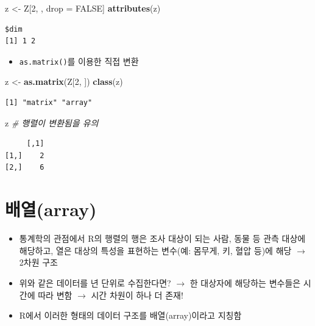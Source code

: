 \documentclass[
  11pt,
]{krantz}
\newenvironment{Shaded}{\begin{snugshade}}{\end{snugshade}}
\newcommand{\CommentTok}[1]{\textcolor[rgb]{0.37,0.37,0.37}{\textit{#1}}}
\newcommand{\DecValTok}[1]{\textcolor[rgb]{0.06,0.06,0.06}{#1}}
\newcommand{\KeywordTok}[1]{\textcolor[rgb]{0.27,0.27,0.27}{\textbf{#1}}}
\newcommand{\NormalTok}[1]{#1}
\newcommand{\OtherTok}[1]{\textcolor[rgb]{0.37,0.37,0.37}{#1}}
\newcommand{\StringTok}[1]{\textcolor[rgb]{0.5,0.5,0.5}{#1}}
\providecommand{\tightlist}{%
  \setlength{\itemsep}{0pt}\setlength{\parskip}{0pt}}
\begin{document}
\footnotesize

\begin{Shaded}
\begin{Highlighting}[]
\NormalTok{z <-}\StringTok{ }\NormalTok{Z[}\DecValTok{2}\NormalTok{, , drop =}\StringTok{ }\OtherTok{FALSE}\NormalTok{]}
\KeywordTok{attributes}\NormalTok{(z)}
\end{Highlighting}
\end{Shaded}

\begin{verbatim}
$dim
[1] 1 2
\end{verbatim}

\normalsize

\begin{itemize}
\tightlist
\item
  \texttt{as.matrix()}를 이용한 직접 변환
\end{itemize}

\footnotesize

\begin{Shaded}
\begin{Highlighting}[]
\NormalTok{z <-}\StringTok{ }\KeywordTok{as.matrix}\NormalTok{(Z[}\DecValTok{2}\NormalTok{, ])}
\KeywordTok{class}\NormalTok{(z)}
\end{Highlighting}
\end{Shaded}

\begin{verbatim}
[1] "matrix" "array" 
\end{verbatim}

\begin{Shaded}
\begin{Highlighting}[]
\NormalTok{z }\CommentTok{# 행렬이 변환됨을 유의}
\end{Highlighting}
\end{Shaded}

\begin{verbatim}
     [,1]
[1,]    2
[2,]    6
\end{verbatim}

\normalsize

\hypertarget{array}{%
\section{배열(array)}\label{array}}

\begin{itemize}
\tightlist
\item
  통계학의 관점에서 R의 행렬의 행은 조사 대상이 되는 사람, 동물 등 관측 대상에 해당하고, 열은 대상의 특성을 표현하는 변수(예: 몸무게, 키, 혈압 등)에 해당 \(\rightarrow\) 2차원 구조
\item
  위와 같은 데이터를 년 단위로 수집한다면? \(\rightarrow\) 한 대상자에 해당하는 변수들은 시간에 따라 변함 \(\rightarrow\) 시간 차원이 하나 더 존재!
\item
  R에서 이러한 형태의 데이터 구조를 배열(array)이라고 지칭함
\end{itemize}
\end{document}

